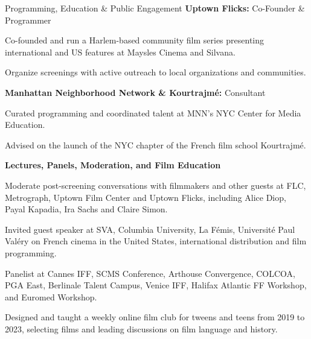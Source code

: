 \begin{rubric}{Programming, Education \& Public Engagement}
\entry*[2016--present]%
\textbf{Uptown Flicks:} Co-Founder \& Programmer
\par
\begin{cvitems}
  \item Co-founded and run a Harlem-based community film series presenting international and
  US features at Maysles Cinema and Silvana.
  \item Organize screenings with active outreach to local organizations and communities.
\end{cvitems}

\entry*[2023--2024]%
\textbf{Manhattan Neighborhood Network \& Kourtrajm\'e:} Consultant
\par
\begin{cvitems}
  \item Curated programming and coordinated talent at MNN's NYC Center for Media Education.
  \item Advised on the launch of the NYC chapter of the French film school Kourtrajm\'e.
\end{cvitems}

\entry*[2011--present]%
\textbf{Lectures, Panels, Moderation, and Film Education}
\par
\begin{cvitems}
  \item Moderate post-screening conversations with filmmakers and other guests at FLC,
  Metrograph, Uptown Film Center and Uptown Flicks, including Alice Diop, Payal Kapadia, Ira
  Sachs and Claire Simon.
  \item Invited guest speaker at SVA, Columbia University, La F\'emis, Universit\'e Paul
  Val\'ery on French cinema in the United States, international distribution and film programming.
  \item Panelist at Cannes IFF, SCMS Conference, Arthouse Convergence, COLCOA, PGA East,
  Berlinale Talent Campus, Venice IFF, Halifax Atlantic FF Workshop, and Euromed Workshop.
  \item Designed and taught a weekly online film club for tweens and teens from 2019 to 2023,
  selecting films and leading discussions on film language and history.
\end{cvitems}

\end{rubric}
